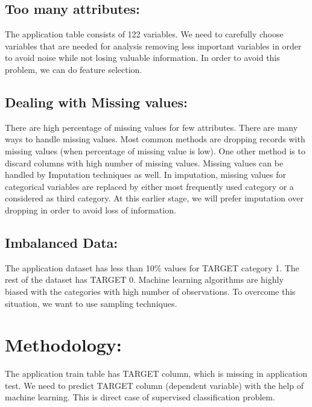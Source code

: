 \documentclass[]{book}
\begin{document}
\hypertarget{too-many-attributes}{%
\section{Too many attributes:}\label{too-many-attributes}}

The application table consists of 122 variables. We need to carefully choose variables that are needed for analysis removing less important variables in order to avoid noise while not losing valuable information. In order to avoid this problem, we can do feature selection.

\hypertarget{dealing-with-missing-values}{%
\section{Dealing with Missing values:}\label{dealing-with-missing-values}}

There are high percentage of missing values for few attributes. There are many ways to handle missing values. Most common methods are dropping records with missing values (when percentage of missing value is low). One other method is to discard columns with high number of missing values. Missing values can be handled by Imputation techniques as well. In imputation, missing values for categorical variables are replaced by either most frequently used category or a considered as third category. At this earlier stage, we will prefer imputation over dropping in order to avoid loss of information.

\hypertarget{imbalanced-data}{%
\section{Imbalanced Data:}\label{imbalanced-data}}

The application dataset has less than 10\% values for TARGET category 1. The rest of the dataset has TARGET 0. Machine learning algorithms are highly biased with the categories with high number of observations. To overcome this situation, we want to use sampling techniques.

\hypertarget{methodology}{%
\chapter{Methodology:}\label{methodology}}

The application train table has TARGET column, which is missing in application test. We need to predict TARGET column (dependent variable) with the help of machine learning. This is direct case of supervised classification problem.
\end{document}
